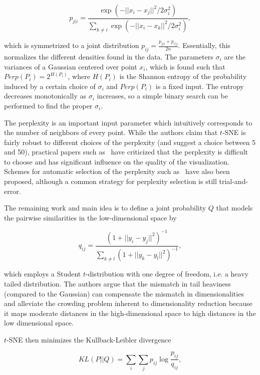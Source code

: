 \begin{equation}
    p_{j | i} = \frac{\exp(-||x_i - x_j||^2 / 2\sigma_i^2)}{\sum_{k \neq i} \exp(-||x_i - x_k||^2 / 2\sigma_i^2)},
\end{equation}

which is symmetrized to a joint distribution $p_{ij} = \frac{p_{j | i} + p_{i |
j}}{2n}$. Essentially, this normalizes the different densities found in the
data. The parameters $\sigma_i$ are the variances of a Gaussian centered over
point $x_i$, which is found such that $Perp(P_i) = 2^{H(P_i)}$, where $H(P_i)$
is the Shannon entropy of the probability induced by a certain choice of
$\sigma_i$ and $Perp(P_i)$ is a fixed input. The entropy decreases
monotonically as $\sigma_i$ increases, so a simple binary search can be
performed to find the proper $\sigma_i$.

The perplexity is an important input parameter which intuitively corresponds to the
number of neighbors of every point. While the authors claim that $t$-SNE is fairly
robust to different choices of the perplexity (and suggest a choice between 5 and 50), practical papers such as~\cite{art_tsne}
have criticized that the perplexity is difficult to choose and has significant
influence on the quality of the visualization. Schemes for automatic selection of
the perplexity such as~\cite{automatic_tsne} have also been proposed, although a common
strategy for perplexity selection is still trial-and-error.

The remaining work and main idea is to define a joint probability $Q$ that models the
pairwise similarities in the low-dimensional space by

\begin{equation}
    q_{ij} = \frac{(1 + || y_i - y_j ||^2)^{-1}}{\sum_{k \neq l } ( 1 + ||y_k - y_l ||^2)^{-1}},
\end{equation}

which employs a Student $t$-distribution with  one degree of freedom, i.e. a heavy tailed
distribution. The authors argue that the mismatch in tail heaviness (compared to the Gaussian) can compensate the
mismatch in dimensionalities and alleviate the crowding problem inherent to dimensionality reduction because
it maps moderate distances in the high-dimensional space to high distances in the low
dimensional space.

$t$-SNE then minimizes the Kullback-Leibler divergence

\begin{equation}
    KL(P || Q) = \sum_i \sum_j p_{ij} \log \frac{p_{ij}}{q_{ij}},
\end{equation}

